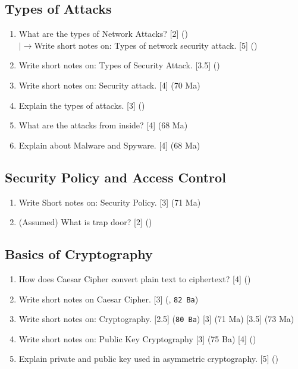\documentclass[12pt]{article}
\newcommand{\lb}{\\$\left|\rightarrow\right.$}
\begin{document}
	\subsection{Types of Attacks}
		\begin{enumerate}[noitemsep, topsep=0pt]
			\item What are the types of Network Attacks? \hfill [2] ()
			\lb Write short notes on: Types of network security attack. \hfill [5] ()

			\item Write short notes on: Types of Security Attack. \hfill [3.5] ()

			\item Write short notes on: Security attack. \hfill [4] (70 Ma)

			\item Explain the types of attacks. \hfill [3] ()

			\item What are the attacks from inside? \hfill [4] (68 Ma)

			\item Explain about Malware and Spyware. \hfill [4] (68 Ma)
		\end{enumerate}

	\subsection{Security Policy and Access Control}
		\begin{enumerate}[noitemsep, topsep=0pt]
			\item Write Short notes on: Security Policy. \hfill [3] (71 Ma)

			\item (Assumed) What is trap door? \hfill [2] ()
		\end{enumerate}

	\subsection{Basics of Cryptography}
		\begin{enumerate}[noitemsep, topsep=0pt]
			\item How does Caesar Cipher convert plain text to ciphertext? \hfill [4] ()

			\item Write short notes on Caesar Cipher. \hfill [3] (, \texttt{82 Ba})

			\item Write short notes on: Cryptography. \hfill [2.5] (\texttt{80 Ba}) [3] (71 Ma) [3.5] (73 Ma)

			\item Write short notes on: Public Key Cryptography \hfill [3] (75 Ba) [4] ()

			\item Explain private and public key used in asymmetric cryptography. \hfill [5] ()
		\end{enumerate}
\end{document}

